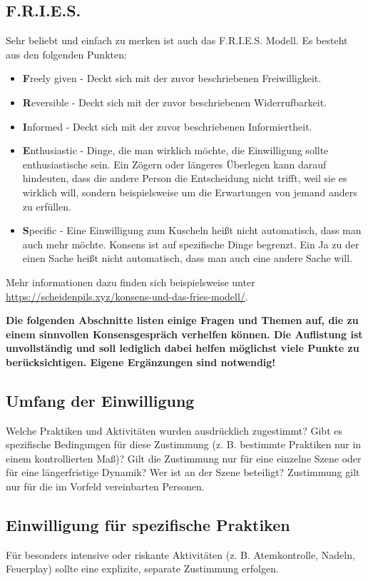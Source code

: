 \documentclass[a4paper,12pt]{article}
\begin{document}
\subsection{F.R.I.E.S.}
Sehr beliebt und einfach zu merken ist auch das F.R.I.E.S. Modell. Es besteht aus den folgenden Punkten:
\begin{itemize}
	\item \textbf{F}reely given - Deckt sich mit der zuvor beschriebenen Freiwilligkeit.
	\item \textbf{R}eversible - Deckt sich mit der zuvor beschriebenen Widerrufbarkeit.
	\item \textbf{I}nformed - Deckt sich mit der zuvor beschriebenen Informiertheit.
	\item \textbf{E}nthusiastic - Dinge, die man wirklich möchte, die Einwilligung sollte enthusiastische sein. Ein Zögern oder längeres Überlegen kann darauf hindeuten, dass die andere Person die Entscheidung nicht trifft, weil sie es wirklich will, sondern beispielsweise um die Erwartungen von jemand anders zu erfüllen.
	\item \textbf{S}pecific - Eine Einwilligung zum Kuscheln heißt nicht automatisch, dass man auch mehr möchte. Konsens ist auf spezifische Dinge begrenzt. Ein Ja zu der einen Sache heißt nicht automatisch, dass man auch eine andere Sache will.
\end{itemize}
Mehr informationen dazu finden sich beispielsweise unter \url{https://scheidenpils.xyz/konsens-und-das-fries-modell/}. \bigbreak

\textbf{Die folgenden Abschnitte listen einige Fragen und  Themen auf, die zu einem sinnvollen Konsensgespräch verhelfen können. Die Auflistung ist unvollständig und soll lediglich dabei helfen möglichst viele Punkte zu berücksichtigen. Eigene Ergänzungen sind notwendig!}

 \subsection{Umfang der Einwilligung}
Welche Praktiken und Aktivitäten wurden ausdrücklich zugestimmt? Gibt es spezifische Bedingungen für diese Zustimmung (z. B. bestimmte Praktiken nur in einem kontrollierten Maß)? Gilt die Zustimmung nur für eine einzelne Szene oder für eine längerfristige Dynamik? Wer ist an der Szene beteiligt? Zustimmung gilt nur für die im Vorfeld vereinbarten Personen.

 \subsection{Einwilligung für spezifische Praktiken}
 Für besonders intensive oder riskante Aktivitäten (z. B. Atemkontrolle, Nadeln, Feuerplay) sollte eine explizite, separate Zustimmung erfolgen.
\end{document}
